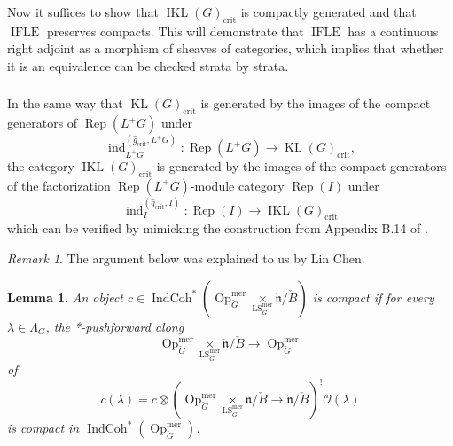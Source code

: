 \documentclass[10pt]{amsart}
\newtheorem{lem}[subsubsection]{Lemma}
\theoremstyle{remark}
\newtheorem{rem}[subsubsection]{Remark}
\newcommand{\on}[1]{\operatorname{#1}}
\newcommand{\IndCoh}{\on{IndCoh}}
\newcommand{\KL}{\on{KL}(G)_{\on{crit}}}
\newcommand{\IKL}{\on{IKL}(G)_{\on{crit}}}
\newcommand{\Gcheck}{\check{G}}
\newcommand{\ncheck}{\check{\mathfrak{n}}}
\newcommand{\Bcheck}{\check{B}}
\newcommand{\sssec}[1]{\subsubsection{}}
\begin{document}
\sssec{}
Now it suffices to show that $\IKL$ is compactly generated and that $\on{IFLE}$ preserves compacts. This will demonstrate that $\on{IFLE}$ has a continuous right adjoint as a morphism of sheaves of categories, which implies that whether it is an equivalence can be checked strata by strata.

\sssec{}
In the same way that $\KL$ is generated by the images of the compact generators of $\on{Rep}(L^+G)$ under
$$
\on{ind}_{L^+G}^{(\hat{g}_{\on{crit}}, L^+G)} : \on{Rep}(L^+G) \to \KL,
$$
the category $\IKL$ is generated by the images of the compact generators of the factorization $\on{Rep}(L^+G)$-module category $\on{Rep}(I)$ under
$$
\on{ind}_{I}^{(\hat{g}_{\on{crit}}, I)} : \on{Rep}(I) \to \IKL
$$
which can be verified by mimicking the construction from Appendix B.14 of \cite{GLC2}.

\begin{rem}
    The argument below was explained to us by Lin Chen.
\end{rem}
\begin{lem}
    An object $c \in \IndCoh^*(\on{Op}_{\Gcheck}^{\on{mer}} \underset{\on{LS}_{\Gcheck}^{\on{mer}}}{\times} \ncheck/\Bcheck)$ is compact if for every $\lambda \in \Lambda_{G}$, the *-pushforward along
    $$
    \on{Op}_{\Gcheck}^{\on{mer}} \underset{\on{LS}_{\Gcheck}^{\on{mer}}}{\times} \ncheck/\Bcheck \longrightarrow \on{Op}_{\Gcheck}^{\on{mer}}
    $$
    of
    $$
    c(\lambda) = c \otimes (\on{Op}_{\Gcheck}^{\on{mer}} \underset{\on{LS}_{\Gcheck}^{\on{mer}}}{\times} \ncheck/\Bcheck \to \ncheck/\Bcheck)^! \mathcal{O}(\lambda)
    $$
    is compact in $\IndCoh^*(\on{Op}_{\Gcheck}^{\on{mer}})$.
\end{lem}
\end{document}
